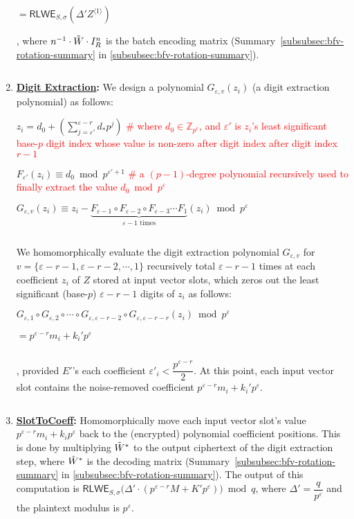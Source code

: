 \begin{tcolorbox}[title={\textbf{\tboxlabel{\ref*{subsubsec:bfv-bootstrapping-summary}} BFV Bootstrapping}}]
\begin{enumerate}
$= \textsf{RLWE}_{S, \sigma}(\Delta' Z^{\langle1\rangle})$

, where $n^{-1}\cdot \tilde{W}\cdot I_R^n$ is the batch encoding matrix (Summary~\ref*{subsubsec:bfv-rotation-summary} in \autoref{subsubsec:bfv-rotation-summary}). 

$ $

\item \textbf{\underline{Digit Extraction}:} We design a polynomial $G_{\varepsilon,v}(z_i)$ (a digit extraction polynomial) as follows:

$z_i = d_0 + \left(\sum\limits_{j=\varepsilon'}^{\varepsilon-r} d_* p^j\right)$ \textcolor{red}{ \# where $d_0 \in \mathbb{Z}_{p^r}$, and $\varepsilon'$ is $z_i$'s least significant base-$p$ digit index whose value is non-zero after digit index after digit index $r-1$}

$F_{\varepsilon'}(z_i) \equiv d_0 \bmod p^{\varepsilon'+1}$ \textcolor{red}{ \# a $(p-1)$-degree polynomial recursively used to finally extract the value $d_0 \bmod p^{\varepsilon}$}

$G_{\varepsilon,v}(z_i) \equiv z_i - \underbrace{F_{\varepsilon-1} \circ F_{\varepsilon-2} \circ F_{\varepsilon-3} \cdots F_{1}}_{\varepsilon - 1 \text{ times}} (z_i) \bmod p^\varepsilon$

$ $

We homomorphically evaluate the digit extraction polynomial $G_{\varepsilon,v}$ for $v = \{\varepsilon-r-1, \varepsilon-r-2, \cdots, 1\}$ recursively total $\varepsilon-r-1$ times at each coefficient $z_i$ of $Z$ stored at input vector slots, which zeros out the least significant (base-$p$) $\varepsilon-r-1$ digits of $z_i$ as follows:

$G_{\varepsilon,1} \circ G_{\varepsilon,2} \circ \cdots \circ G_{\varepsilon,\varepsilon-r-2} \circ G_{\varepsilon,\varepsilon-r-r} (z_i) \bmod p^\varepsilon$

$= p^{\varepsilon-r}m_i + k_i'p^\varepsilon$

$ $

, provided $E'$'s each coefficient $\varepsilon'_i < \dfrac{p^{\varepsilon-r}}{2}$. At this point, each input vector slot contains the noise-removed coefficient $p^{\varepsilon-r}m_i + k_i'p^\varepsilon$. 

$ $

\item \textbf{\textsf{\underline{SlotToCoeff}}:} Homomorphically move each input vector slot's value $p^{\varepsilon-r}m_i + k_ip^\varepsilon$ back to the (encrypted) polynomial coefficient positions. This is done by multiplying $\tilde{W}^*$ to the output ciphertext of the digit extraction step, where $\tilde{W}^*$ is the decoding matrix (Summary~\ref*{subsubsec:bfv-rotation-summary} in \autoref{subsubsec:bfv-rotation-summary}). The output of this computation is $\textsf{RLWE}_{S, \sigma}\bm(\Delta'\cdot (p^{\varepsilon-r}M + K'p^\varepsilon) \bm) \bmod q$, where $\Delta' = \dfrac{q}{p^\varepsilon}$ and the plaintext modulus is $p^\varepsilon$. 


\end{enumerate}
\end{tcolorbox}
